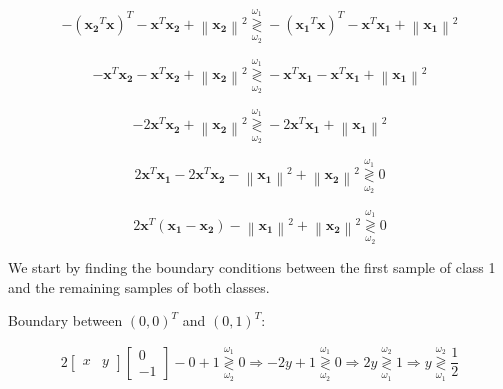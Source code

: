 \documentclass[fleqn]{article}
\newcommand{\norm}[1]{\left \lVert #1 \right \rVert}
\begin{document}
\begin{enumerate}
		\begin{equation*}
			- (\mathbf{x_2}^T\mathbf{x})^T - \mathbf{x}^T\mathbf{x_2} + \norm{\mathbf{x_2}}^2 \overset{\omega_1}{\underset{\omega_2}{\gtrless}} - (\mathbf{x_1}^T\mathbf{x})^T - \mathbf{x}^T\mathbf{x_1} + \norm{\mathbf{x_1}}^2
		\end{equation*}
		
		\begin{equation*}
			- \mathbf{x}^T\mathbf{x_2} - \mathbf{x}^T\mathbf{x_2} + \norm{\mathbf{x_2}}^2 \overset{\omega_1}{\underset{\omega_2}{\gtrless}} - \mathbf{x}^T\mathbf{x_1} - \mathbf{x}^T\mathbf{x_1} + \norm{\mathbf{x_1}}^2
		\end{equation*}
		
		\begin{equation*}
			- 2\mathbf{x}^T\mathbf{x_2} + \norm{\mathbf{x_2}}^2 \overset{\omega_1}{\underset{\omega_2}{\gtrless}} - 2\mathbf{x}^T\mathbf{x_1} + \norm{\mathbf{x_1}}^2
		\end{equation*}
		
		\begin{equation*}
			2\mathbf{x}^T\mathbf{x_1} - 2\mathbf{x}^T\mathbf{x_2} - \norm{\mathbf{x_1}}^2 + \norm{\mathbf{x_2}}^2 \overset{\omega_1}{\underset{\omega_2}{\gtrless}} 0
		\end{equation*}
		
		\begin{equation*}
			2\mathbf{x}^T(\mathbf{x_1} - \mathbf{x_2}) - \norm{\mathbf{x_1}}^2 + \norm{\mathbf{x_2}}^2 \overset{\omega_1}{\underset{\omega_2}{\gtrless}} 0
		\end{equation*}
		
		We start by finding the boundary conditions between the first sample of class 1 and the remaining samples of both classes.
		
		Boundary between $(0,0)^T$ and $(0,1)^T$:
		
		\begin{equation*}
			2 \begin{bmatrix} x & y \end{bmatrix} \begin{bmatrix}0\\ -1\end{bmatrix} - 0 + 1 \overset{\omega_1}{\underset{\omega_2}{\gtrless}} 0 \Rightarrow -2y + 1 \overset{\omega_1}{\underset{\omega_2}{\gtrless}} 0 \Rightarrow 2y \overset{\omega_2}{\underset{\omega_1}{\gtrless}} 1 \Rightarrow y \overset{\omega_2}{\underset{\omega_1}{\gtrless}} \frac{1}{2}			
		\end{equation*}
		

\end{enumerate}
\end{document}
